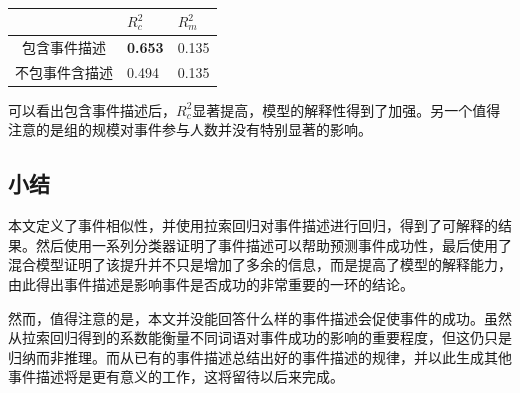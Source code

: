 \begin{table}[htbp]
	\centering
  \caption{}
  \label{t3}
	\begin{tabular}{cll}
		\hline
                           &  \(R_c^2\) & \(R_m^2\) \\ 
    \hline
		包含事件描述                       & \textbf{0.653} & 0.135 \\ 
    不包事件含描述                        & 0.494 & 0.135 \\ 
    \hline
	\end{tabular}
\end{table}

可以看出包含事件描述后，\(R_c^2\)显著提高，模型的解释性得到了加强。另一个值得注意的是组的规模对事件参与人数并没有特别显著的影响。

\subsection{小结}
本文定义了事件相似性，并使用拉索回归对事件描述进行回归，得到了可解释的结果。然后使用一系列分类器证明了事件描述可以帮助预测事件成功性，最后使用了混合模型证明了该提升并不只是增加了多余的信息，而是提高了模型的解释能力，由此得出事件描述是影响事件是否成功的非常重要的一环的结论。

然而，值得注意的是，本文并没能回答什么样的事件描述会促使事件的成功。虽然从拉索回归得到的系数能衡量不同词语对事件成功的影响的重要程度，但这仍只是归纳而非推理。而从已有的事件描述总结出好的事件描述的规律，并以此生成其他事件描述将是更有意义的工作，这将留待以后来完成。

% 